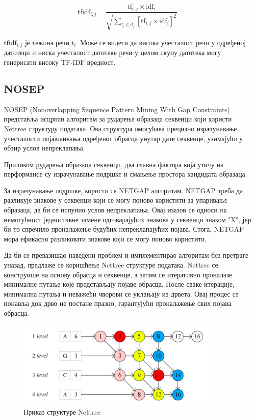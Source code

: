 \documentclass[12pt]{article}
\begin{document}
$$\mathrm{tfidf}_{i,j} = \frac{\mathrm{tf}_{i,j} \times \mathrm{idf}_{i}}{\sqrt{\sum_{t_i \in d_j} \left[\mathrm{tf}_{i,j} \times \mathrm{idf}_i\right]^2}}$$


$\mathrm{tfidf}_{i,j}$ је тежина речи ${t}_{i}$. Може се видети да висока
учесталост речи у одређеној датотеци и ниска учесталост датотеке
речи у целом скупу датотека могу генерисати високу TF-IDF вредност. 

\subsection{NOSEP}

NOSEP\cite{8053457} (Nonoverlapping Sequence Pattern Mining With Gap Constraints) представља исцрпан алгоритам за рударење образаца секвенци који користи Nettree структуру података. Ова структура омогућава прецизно израчунавање учесталости појављивања одређеног обрасца унутар дате секвенце, узимајући у обзир услов непреклапања. 

Приликом рударења образаца секвенци, два главна фактора која утичу на перформансе су израчунавање подршке и смањење простора кандидата образаца. 

За израчунавање подршке, користи се NETGAP алгоритам. NETGAP треба да  разликује знакове у секвенци који се могу поново користити за упаривање образаца, да би се испунио услов непреклапања. Овај изазов се односи на немогућност једноставне замене одговарајућих знакова у секвенци знаком "X", јер би то спречило проналажење будућих непреклапајућих појава. Стога, NETGAP мора ефикасно разликовати знакове који се могу поново користити.

Да би се превазишао наведени проблем и имплементирао алгоритам без претраге уназад, предлаже се коришћење Nettree структуре података. Nettree се конструише на основу обрасца и секвенце, а затим се итеративно проналазе минималне путање које представљају појаве обрасца. После сваке итерације, минимална путања и неважећи чворови се уклањају из дрвета. Овај процес се понавља док дрво не постане празно, гарантујући проналажење свих појава обрасца.

\begin{figure}[h]
    \centering
    \includegraphics[width=0.6\linewidth]{images/nettree.png}
    \caption{Приказ структуре Nettree}
    \label{fig:nettree}
\end{figure}
\end{document}
